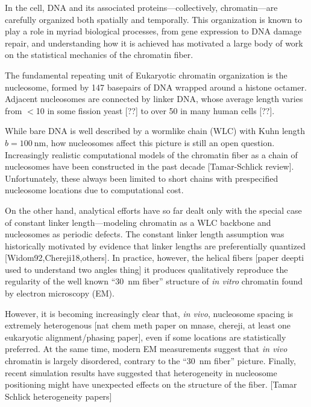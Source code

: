 \documentclass[%
 reprint,
superscriptaddress,
showpacs,preprintnumbers,
 amsmath,amssymb,
 aps,
 prl,
]{revtex4-1}
\begin{document}
In the cell, DNA and its associated proteins---collectively, chromatin---are
    carefully organized both spatially and temporally.
This organization is known to play a role in myriad biological processes,
    from gene expression to DNA damage repair, and understanding how it is
    achieved has motivated a large body of work on the statistical mechanics of
    the chromatin fiber.

The fundamental repeating unit of Eukaryotic chromatin organization is the
    nucleosome, formed by 147 basepairs of DNA wrapped around a histone octamer.
Adjacent nucleosomes are connected by linker DNA, whose average length varies from
    $<$\SI{10}{\basepair} in some fission yeast [??] to over \SI{50}{\basepair} in
    many human cells [??].

While bare DNA is well described by a wormlike chain (WLC) with Kuhn length
    {$b = \SI{100}{\nano\metre}$}, how nucleosomes affect this picture is still an
    open question.
Increasingly realistic computational models of the chromatin fiber as a chain
    of nucleosomes have been constructed in the past decade [Tamar-Schlick review].
Unfortunately, these always been limited to short chains with prespecified nucleosome
    locations due to computational cost.

On the other hand, analytical efforts have so far dealt only with the special
    case of constant linker length---modeling chromatin as a WLC backbone and
    nucleosomes as periodic defects.
The constant linker length assumption was historically motivated by evidence
    that linker lengths are preferentially quantized [Widom92,Chereji18,others].
In practice, however, the helical fibers [paper deepti used to understand
    two angles thing] it produces qualitatively reproduce the regularity of the
    well known ``\SI{30}{\nano\metre} fiber'' structure of \textit{in vitro}
    chromatin found by electron microscopy (EM).

However, it is becoming increasingly clear that, \textit{in vivo}, nucleosome
    spacing is extremely heterogenous [nat chem meth paper on mnase, chereji, at
    least one eukaryotic alignment/phasing paper], even if some locations are
    statistically preferred.
At the same time, modern EM measurements suggest that \textit{in vivo} chromatin
    is largely disordered, contrary to the ``\SI{30}{\nano\metre} fiber''
    picture.
Finally, recent simulation results have suggested that heterogeneity in
    nucleosome positioning might have unexpected effects on the structure of the
    fiber. [Tamar Schlick heterogeneity papers]
\end{document}
